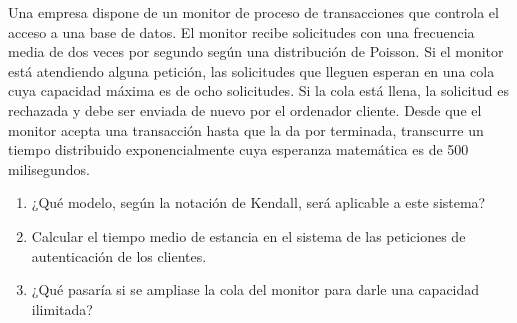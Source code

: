 \begin{problem}[26]
Una empresa dispone de un monitor de proceso de transacciones que controla el acceso a una base de datos. El monitor recibe solicitudes con una frecuencia media de dos veces por segundo según una distribución de Poisson. Si el monitor está atendiendo alguna petición, las solicitudes que lleguen esperan en una cola cuya capacidad máxima es de ocho solicitudes. Si la cola está llena, la solicitud es rechazada y debe ser enviada de nuevo por el ordenador cliente.
Desde que el monitor acepta una transacción hasta que la da por terminada, transcurre un tiempo distribuido exponencialmente cuya esperanza matemática es de 500 milisegundos.
\begin{enumerate}
\item¿Qué modelo, según la notación de Kendall, será aplicable a este sistema?
\item Calcular el tiempo medio de estancia en el sistema de las peticiones de autenticación de los clientes.
\item ¿Qué pasaría si se ampliase la cola del monitor para darle una capacidad ilimitada?
\end{enumerate}

\solution

\yoP


\end{problem}

